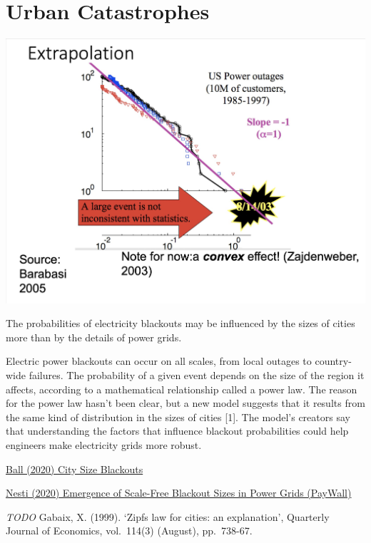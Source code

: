 \documentclass[
]{book}
\begin{document}
\hypertarget{urban-catastrophes}{%
\section{Urban Catastrophes}\label{urban-catastrophes}}

\includegraphics{fig/US_Power_Outages.jpeg}

The probabilities of electricity blackouts may be influenced by the sizes of cities
more than by the details of power grids.

Electric power blackouts can occur on all scales, from local outages to country-wide failures. The probability of a given event depends on the size of the region it affects, according to a mathematical relationship called a power law. The reason for the power law hasn't been clear, but a new model suggests that it results from the same kind of distribution in the sizes of cities {[}1{]}. The model's creators say that understanding the factors that influence blackout probabilities could help engineers make electricity grids more robust.

\href{https://physics.aps.org/articles/v13/122}{Ball (2020) City Size Blackouts}

\href{https://journals.aps.org/prl/abstract/10.1103/PhysRevLett.125.058301}{Nesti (2020) Emergence of Scale-Free Blackout Sizes in Power Grids (PayWall)}

\emph{TODO}
Gabaix, X. (1999). `Zipfs law for cities: an explanation', Quarterly Journal of Economics, vol.~114(3)
(August), pp.~738-67.
\end{document}
